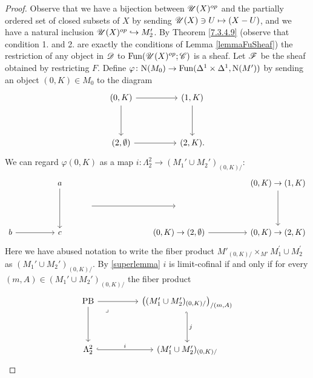 \documentclass[../../thesis.tex]{subfiles}
\begin{document}
\begin{proof}
    Observe that we have a bijection between $\mathscr{U}(X)^{op}$ and the partially ordered set of closed subsets of $X$ by sending $\mathscr{U}(X) \ni U \mapsto (X - U)$, and we have a natural inclusion $\mathscr{U}(X)^{op} \hookrightarrow M_2'$.
    By Theorem \ref{7.3.4.9} (observe that condition 1. and 2. are exactly the conditions of Lemma \ref{lemmaFuSheaf}) the restriction of any object in $\mathscr{D}$ to $\mathrm{Fun}(\mathscr{U}(X)^{op}; \mathscr{C})$ is a sheaf.
    Let $\mathscr{F}$ be the sheaf obtained by restricting $F$.
    Define $\varphi\colon\mathrm{N}(M_0) \to \mathrm{Fun}(\Delta^1\times \Delta^1, \mathrm{N}(M'))$ by sending an object $(0,K) \in M_0$ to the diagram
    \[\begin{tikzcd}
            {(0,K)} && {(1,K)} \\
            \\
            {(2,\emptyset)} && {(2,K)}
            \arrow[from=1-1, to=1-3]
            \arrow[from=1-3, to=3-3]
            \arrow[from=3-1, to=3-3]
            \arrow[from=1-1, to=3-1].
        \end{tikzcd}\]
    We can regard $\varphi(0,K)$ as a map $i: \Lambda_2^2 \to (M_1'\cup M_2')_{(0,K)/}$:
    \[\begin{tikzcd}
            && a &&&&&& {(0,K)\to(1,K)} \\
            &&& {} &&& {} \\
            b && c &&&& {(0,K)\to(2,\emptyset)} && {(0,K)\to(2,K)}
            \arrow[from=1-9, to=3-9]
            \arrow[from=3-7, to=3-9]
            \arrow[from=3-1, to=3-3]
            \arrow[from=1-3, to=3-3]
            \arrow[from=2-4, to=2-7]
        \end{tikzcd}\]
    Here we have abused notation to write the fiber product $M'_{(0, K) /} \times_{M'}M_1^{\prime} \cup M_2^{\prime}$ as $ (M_1'\cup M_2')_{(0,K)/}$. By \ref{superlemma} $i$ is limit-cofinal if and only if for every $(m,A) \in (M_1'\cup M_2')_{(0,K)/}$ the fiber product
    \[\begin{tikzcd}
            {\mathrm{PB}} && {\left((M_1'\cup M_2')_{(0,K)/}\right)_{/(m,A)}} \\
            \\
            {\Lambda_2^2} && {(M_1'\cup M_2')_{(0,K)/}}
            \arrow[from=1-1, to=1-3]
            \arrow["j", hook',from=1-3, to=3-3]
            \arrow["i", hook,from=3-1, to=3-3]
            \arrow[from=1-1, to=3-1]
            \arrow["\lrcorner"{anchor=center, pos=0.125}, draw=none, from=1-1, to=3-3]
        \end{tikzcd}\]

\end{proof}
\end{document}
